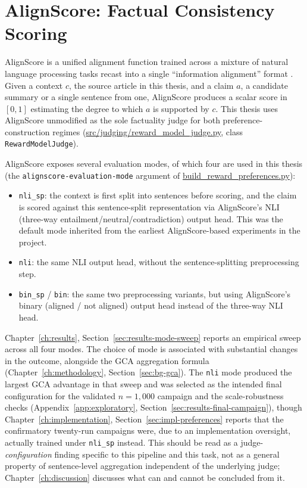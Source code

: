 \section{AlignScore: Factual Consistency Scoring}
\label{sec:bg-alignscore}

AlignScore is a unified alignment function trained across a mixture of natural
language processing tasks recast into a single ``information alignment'' format
\citep{zha2023alignscore}. Given a context $c$, the source article in this thesis,
and a claim $a$, a candidate summary or a single sentence from one, AlignScore
produces a scalar score in $[0, 1]$ estimating the degree to which $a$ is supported
by $c$. This thesis uses AlignScore unmodified as the sole factuality judge for
both preference-construction regimes
(\url{src/judging/reward_model_judge.py}, class \texttt{RewardModelJudge}).

AlignScore exposes several evaluation modes, of which four are used in this thesis
(the \texttt{alignscore-evaluation-mode} argument of
\url{build_reward_preferences.py}):

\begin{itemize}
  \item \texttt{nli\_sp}: the context is first split into sentences before scoring,
    and the claim is scored against this sentence-split representation via
    AlignScore's NLI (three-way entailment/neutral/contradiction) output head. This
    was the default mode inherited from the earliest AlignScore-based experiments
    in the project.
  \item \texttt{nli}: the same NLI output head, without the sentence-splitting
    preprocessing step.
  \item \texttt{bin\_sp} / \texttt{bin}: the same two preprocessing variants, but
    using AlignScore's binary (aligned / not aligned) output head instead of the
    three-way NLI head.
\end{itemize}

Chapter~\ref{ch:results}, Section~\ref{sec:results-mode-sweep} reports an empirical
sweep across all four modes. The choice of mode is associated with substantial
changes in the outcome, alongside the GCA aggregation formula
(Chapter~\ref{ch:methodology}, Section~\ref{sec:bg-gca}). The \texttt{nli} mode produced the largest GCA
advantage in that sweep and was selected as the intended final
configuration for the validated $n=1{,}000$ campaign and the
scale-robustness checks (Appendix~\ref{app:exploratory},
Section~\ref{sec:results-final-campaign}), though
Chapter~\ref{ch:implementation}, Section~\ref{sec:impl-preferences} reports
that the confirmatory twenty-run campaigns were, due to an implementation
oversight, actually trained under \texttt{nli\_sp} instead. This should be read as a
judge-\emph{configuration} finding specific to this pipeline and this task, not as
a general property of sentence-level aggregation independent of the underlying
judge; Chapter~\ref{ch:discussion} discusses what can and cannot be concluded from
it.

